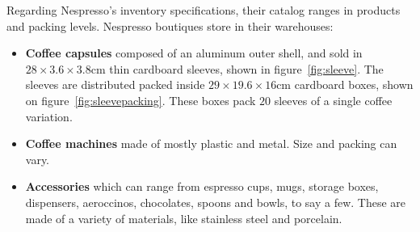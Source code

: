 Regarding Nespresso's inventory specifications, their catalog ranges in products and packing levels. Nespresso boutiques store in their warehouses: 

\begin{itemize}
    \item \textbf{Coffee capsules} composed of an aluminum outer shell, and sold in $28\times3.6\times3.8$cm thin cardboard sleeves, shown in figure~\ref{fig:sleeve}. The sleeves are distributed packed inside $29\times19.6\times16$cm cardboard boxes, shown on figure~\ref{fig:sleevepacking}. These boxes pack $20$ sleeves of a single coffee variation.
    \item \textbf{Coffee machines} made of mostly plastic and metal. Size and packing can vary.
    \item \textbf{Accessories} which can range from espresso cups, mugs, storage boxes, dispensers, aeroccinos, chocolates, spoons and bowls, to say a few. These are made of a variety of materials, like stainless steel and porcelain.
\end{itemize}

